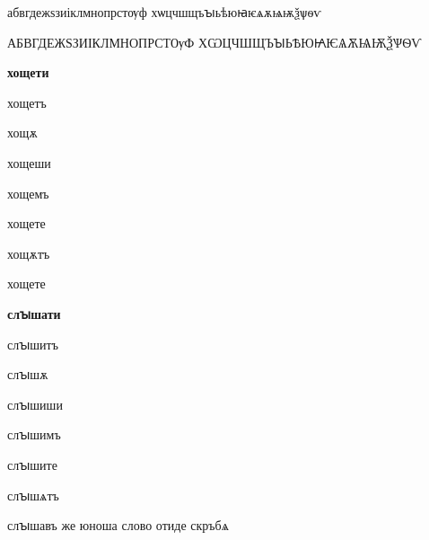 \documentclass{article}
\begin{document}
	\raggedright
	абвгдежѕзиіклмнопрстѹф%
	хѡцчшщъꙑьѣюꙗѥѧѫѩѭѯѱѳѵ
	
	\uppercase{абвгдежѕзиіклмнопрстѹф
		хѡцчшщъꙑьѣюꙗѥѧѫѩѭѯѱѳѵ}
	
	\textbf{хощети}
	
	хощетъ
	
	хощѫ
	
	хощеши
	
	хощемъ
	
	хощете
	
	хощѫтъ
	
	хощете
	
	
	\textbf{слꙑшати}
	
	слꙑшитъ
	
	слꙑшѫ
	
	слꙑшиши
	
	слꙑшимъ
	
	слꙑшите
	
	слꙑшѧтъ
	
	слꙑшавъ же юноша слово отиде скръбѧ
	
\end{document}
